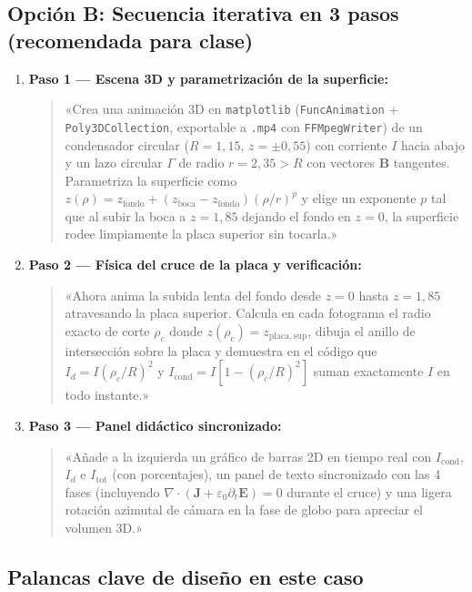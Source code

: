 \documentclass[11pt]{article}
\begin{document}
\subsection{Opción B: Secuencia iterativa en 3 pasos (recomendada para clase)}

\begin{enumerate}
    \item \textbf{Paso 1 --- Escena 3D y parametrización de la superficie:}
    \begin{quote}
    «Crea una animación 3D en \texttt{matplotlib} (\texttt{FuncAnimation} + \texttt{Poly3DCollection}, exportable a \texttt{.mp4} con \texttt{FFMpegWriter}) de un condensador circular ($R = 1{,}15$, $z = \pm 0{,}55$) con corriente $I$ hacia abajo y un lazo circular $\Gamma$ de radio $r = 2{,}35 > R$ con vectores $\mathbf{B}$ tangentes. Parametriza la superficie como $z(\rho) = z_{\mathrm{fondo}} + (z_{\mathrm{boca}} - z_{\mathrm{fondo}})(\rho/r)^p$ y elige un exponente $p$ tal que al subir la boca a $z = 1{,}85$ dejando el fondo en $z = 0$, la superficie rodee limpiamente la placa superior sin tocarla.»
    \end{quote}

    \item \textbf{Paso 2 --- Física del cruce de la placa y verificación:}
    \begin{quote}
    «Ahora anima la subida lenta del fondo desde $z = 0$ hasta $z = 1{,}85$ atravesando la placa superior. Calcula en cada fotograma el radio exacto de corte $\rho_c$ donde $z(\rho_c) = z_{\mathrm{placa,sup}}$, dibuja el anillo de intersección sobre la placa y demuestra en el código que $I_d = I(\rho_c/R)^2$ y $I_{\mathrm{cond}} = I[1 - (\rho_c/R)^2]$ suman exactamente $I$ en todo instante.»
    \end{quote}

    \item \textbf{Paso 3 --- Panel didáctico sincronizado:}
    \begin{quote}
    «Añade a la izquierda un gráfico de barras 2D en tiempo real con $I_{\mathrm{cond}}$, $I_d$ e $I_{\mathrm{tot}}$ (con porcentajes), un panel de texto sincronizado con las 4 fases (incluyendo $\nabla\cdot(\mathbf{J}+\varepsilon_0\partial_t\mathbf{E})=0$ durante el cruce) y una ligera rotación azimutal de cámara en la fase de globo para apreciar el volumen 3D.»
    \end{quote}
\end{enumerate}

\subsection{Palancas clave de diseño en este caso}
\end{document}
